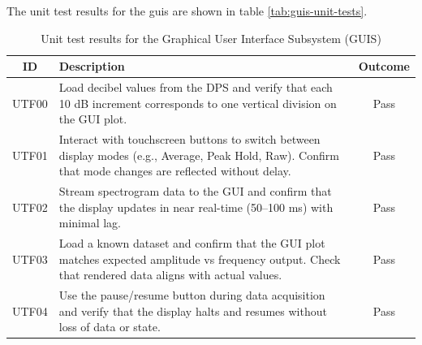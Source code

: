 \documentclass[class=report,11pt,crop=false]{standalone}
\begin{document}
	The unit test results for the \acrshort{guis} are shown in table \ref{tab:guis-unit-tests}.
	
	\begin{table}[ht!]
		\centering
		\begin{tabular}{|c|m{25em}|c|}
			\hline
			\textbf{ID} & \textbf{Description} & \textbf{Outcome} \\
			\hline
			UTF00 & Load decibel values from the DPS and verify that each 10 dB increment corresponds to one vertical division on the GUI plot. & Pass \\
			\hline
			UTF01 & Interact with touchscreen buttons to switch between display modes (e.g., Average, Peak Hold, Raw). Confirm that mode changes are reflected without delay. & Pass \\
			\hline
			UTF02 & Stream spectrogram data to the GUI and confirm that the display updates in near real-time (50–100 ms) with minimal lag. & Pass \\
			\hline
			UTF03 & Load a known dataset and confirm that the GUI plot matches expected amplitude vs frequency output. Check that rendered data aligns with actual values. & Pass \\
			\hline
			UTF04 & Use the pause/resume button during data acquisition and verify that the display halts and resumes without loss of data or state. & Pass \\
			\hline
		\end{tabular}
		\caption{Unit test results for the Graphical User Interface Subsystem (GUIS)}
		\label{tab:gui-unit-tests}
	\end{table}
	
	\ifstandalone
	
	\printnoidxglossary[type=\acronymtype,nonumberlist]
	\fi
\end{document}
